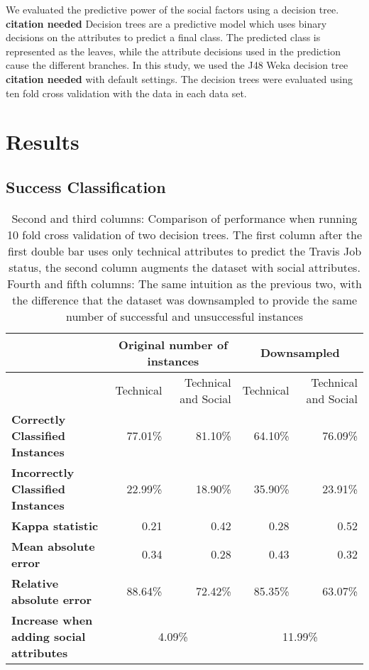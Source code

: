 \documentclass[10pt, conference]{IEEEtran}
\newcommand{\todo}[1]
  {{\scriptsize \textbf{\color{red} {#1}}}}
\begin{document}
We evaluated the predictive power of the social factors using a decision
tree.\todo{citation needed}
Decision trees are a predictive model which uses binary decisions on the
attributes to predict a final class.  The predicted class is represented as the
leaves, while the attribute decisions used in the prediction cause the
different branches.
In this study, we used the J48 Weka decision tree \todo{citation needed} with default settings. The 
decision trees were evaluated using ten fold cross validation with the data in
each data set.

\section{Results}

\subsection{Success Classification}
\begin{table*}[ht]
\centering
\begin{tabular}{l||r|r||r|r}
  & \multicolumn{2}{|c||}{Original number of instances}  & \multicolumn{2}{|c}{Downsampled} \\
\hline
  & Technical & Technical and Social & Technical & Technical and Social \\
\hline
\textbf{Correctly Classified Instances}&  77.01\% & 81.10\%  & 64.10\% & 76.09\%\\

\textbf{Incorrectly Classified Instances}&  22.99\% & 18.90\% & 35.90\% & 23.91\%\\

\textbf{Kappa statistic}& 0.21 &  0.42 & 0.28  & 0.52 \\

\textbf{Mean absolute error}& 0.34 &  0.28 & 0.43 & 0.32\\

\textbf{Relative absolute error}& 88.64\% & 72.42\%  & 85.35\% & 63.07\%\\
\hline
\textbf{Increase when adding social attributes}& \multicolumn{2}{|c||}{4.09\%}  & \multicolumn{2}{|c}{11.99\%}\\

\hline
\end{tabular}
\\
\center
  \caption{ Second and third columns: Comparison of performance when running 10 fold cross validation of two decision trees. The first column after the first double bar uses only technical attributes to predict the Travis Job status, the second column augments the dataset with social attributes. Fourth and fifth columns: The same intuition as the previous two, with the difference that the dataset was downsampled to provide the same number of successful and unsuccessful instances }
  \label{resultsTable}
\end{table*} 
\end{document}
